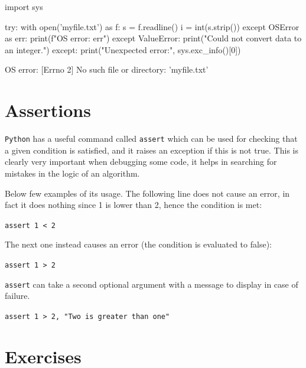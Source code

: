 \begin{ipythonnon}
import sys 

try:
    with open('myfile.txt') as f: 
        s = f.readline()
        i = int(s.strip()) 
except OSError as err:
    print(f"OS error: {err}") 
except ValueError:
    print("Could not convert data to an integer.") 
except:
    print("Unexpected error:", sys.exc_info()[0])
\end{ipythonnon}
\begin{ioutput}
OS error: [Errno 2] No such file or directory: 'myfile.txt'	
\end{ioutput}

\section{Assertions}
\texttt{Python} has a useful command called \texttt{assert} which can be used for checking that a given condition is satisfied, and it raises an exception if this is not true. This is clearly very important when debugging some code, it helps in searching for mistakes in the logic of an algorithm.

Below few examples of its usage. The following line does not cause an error, in fact it does nothing since 1 is lower than 2, hence the condition is met:

\lstinline[language=iPython]|assert 1 < 2|

\noindent
The next one instead causes an error (the condition is evaluated to false): 

\lstinline[language=iPython]|assert 1 > 2|

\noindent
\texttt{assert} can take a second optional argument with a message to display in case of failure.

\lstinline[language=iPython]|assert 1 > 2, "Two is greater than one"|

\section*{Exercises}

